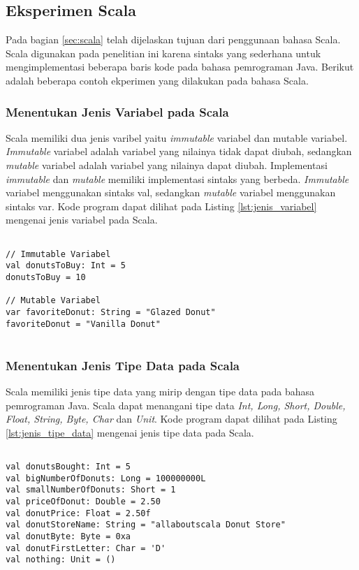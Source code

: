 \subsection{Eksperimen Scala}
Pada bagian \ref{sec:scala} telah dijelaskan tujuan dari penggunaan bahasa Scala. Scala digunakan pada penelitian ini karena sintaks yang sederhana untuk mengimplementasi beberapa baris kode pada bahasa pemrograman Java. Berikut adalah beberapa contoh ekperimen yang dilakukan pada bahasa Scala.

\subsubsection{Menentukan Jenis Variabel pada Scala}
Scala memiliki dua jenis varibel yaitu \textit{immutable} variabel dan mutable variabel. \textit{Immutable} variabel adalah variabel yang nilainya tidak dapat diubah, sedangkan \textit{mutable} variabel adalah variabel yang nilainya dapat diubah. Implementasi \textit{immutable} dan \textit{mutable} memiliki implementasi sintaks yang berbeda. \textit{Immutable} variabel menggunakan sintaks val, sedangkan \textit{mutable} variabel menggunakan sintaks var. Kode program dapat dilihat pada Listing \ref{lst:jenis_variabel} mengenai jenis variabel pada Scala.

\begin{lstlisting}[basicstyle=\ttfamily, frame=single,
	columns=fullflexible, keepspaces=true, breaklines=true, label=lst:jenis_variabel, caption=Menentukan Jenis Variabel pada Scala]
	
// Immutable Variabel
val donutsToBuy: Int = 5
donutsToBuy = 10

// Mutable Variabel
var favoriteDonut: String = "Glazed Donut"
favoriteDonut = "Vanilla Donut"


\end{lstlisting}

\subsubsection{Menentukan Jenis Tipe Data pada Scala}
Scala memiliki jenis tipe data yang mirip dengan tipe data pada bahasa pemrograman Java. Scala dapat menangani tipe data \textit{Int, Long, Short, Double, Float, String, Byte, Char} dan \textit{Unit}. Kode program dapat dilihat pada Listing \ref{lst:jenis_tipe_data} mengenai jenis tipe data pada Scala.

\begin{lstlisting}[basicstyle=\ttfamily, frame=single,
	columns=fullflexible, keepspaces=true, breaklines=true, label=lst:jenis_tipe_data, caption=Menentukan Jenis Tipe Data pada Scala]
	
val donutsBought: Int = 5
val bigNumberOfDonuts: Long = 100000000L
val smallNumberOfDonuts: Short = 1
val priceOfDonut: Double = 2.50
val donutPrice: Float = 2.50f
val donutStoreName: String = "allaboutscala Donut Store"
val donutByte: Byte = 0xa
val donutFirstLetter: Char = 'D'
val nothing: Unit = ()

\end{lstlisting}

